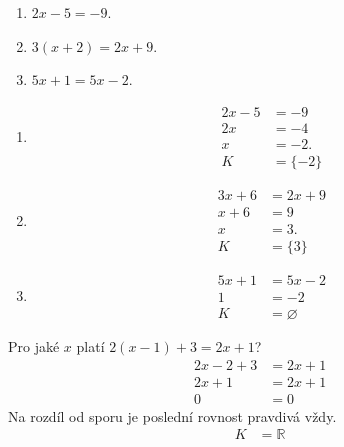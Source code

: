 \documentclass[11pt,a4paper]{article}
\begin{document}
\begin{zadaniReseniBox}[title={Samostatná práce 1}]
\begin{enumerate}[label=\alph*)]
\item $2x-5=-9$.
\item $3(x+2)=2x+9$.
\item $5x+1=5x-2$.
\end{enumerate}
\tcblower
\begin{enumerate}[label=\alph*)]
\item
\[
\begin{aligned}2x-5&=-9\\2x&=-4\\x&=-2. \\[2mm]
K &= \{-2\}
\end{aligned}
\]
\item
\[
\begin{aligned}3x+6&=2x+9\\x+6&=9\\x&=3. \\[2mm]
K &= \{3\}
\end{aligned}
\]
\item
\[
\begin{aligned}5x+1&=5x-2\\1&=-2 \\[2mm]
K &= \varnothing
\end{aligned}
\]
\end{enumerate}
\end{zadaniReseniBox}
\begin{zadaniReseniBox}[title={Rozšíření 1}]
Pro jaké $x$ platí $2(x-1)+3=2x+1$?
\tcblower
\[
\begin{aligned}
2x-2+3&=2x+1\\
2x+1&=2x+1\\
0&=0
\end{aligned}
\]
Na rozdíl od sporu je poslední rovnost pravdivá vždy.
\[
\begin{aligned}
K &= \mathbb R
\end{aligned}
\]
\end{zadaniReseniBox}
\end{document}
